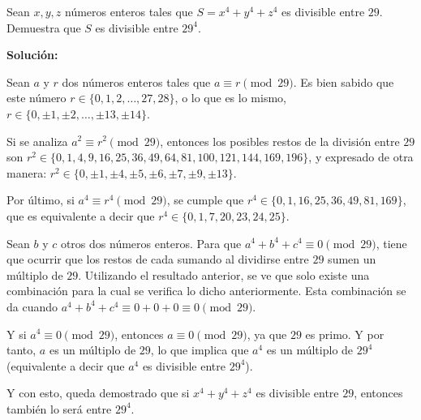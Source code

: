 \documentclass[../../main.tex]{subfiles}
\begin{document}
  \begin{shaded}
    Sean $x, y, z$ números enteros tales que $S = x^4 + y^4 + z^4$ es divisible entre $29$. Demuestra que $S$ es divisible entre $29^4$.
  \end{shaded}

  \textbf{Solución:}

  Sean $a$ y $r$ dos números enteros tales que $a \equiv r \pmod{29}$. Es bien sabido que este número $r \in \{0, 1, 2, \dots, 27, 28\}$, o lo que es lo mismo, $r \in \{0, \pm 1, \pm 2, \dots, \pm 13, \pm 14\}$.

  Si se analiza $a^2 \equiv r^2 \pmod{29}$, entonces los posibles restos de la división entre $29$ son $r^2 \in \{0, 1, 4, 9, 16, 25, 36, 49, 64, 81, 100, 121, 144, 169, 196\}$, y expresado de otra manera: $r^2 \in \{0, \pm 1, \pm 4, \pm 5, \pm 6, \pm 7, \pm 9, \pm 13\}$.

  Por último, si $a^4 \equiv r^4 \pmod{29}$, se cumple que $r^4 \in \{0, 1, 16, 25, 36, 49, 81, 169\}$, que es equivalente a decir que $r^4 \in \{0, 1, 7, 20, 23, 24, 25\}$.

  Sean $b$ y $c$ otros dos números enteros. Para que $a^4 + b^4 + c^4 \equiv 0 \pmod{29}$, tiene que ocurrir que los restos de cada sumando al dividirse entre $29$ sumen un múltiplo de $29$. Utilizando el resultado anterior, se ve que solo existe una combinación para la cual se verifica lo dicho anteriormente. Esta combinación se da cuando $a^4 + b^4 + c^4 \equiv 0 + 0 + 0 \equiv 0 \pmod{29}$.

  Y si $a^4 \equiv 0 \pmod{29}$, entonces $a \equiv 0 \pmod{29}$, ya que $29$ es primo. Y por tanto, $a$ es un múltiplo de $29$, lo que implica que $a^4$ es un múltiplo de $29^4$ (equivalente a decir que $a^4$ es divisible entre $29^4$).

  Y con esto, queda demostrado que si $x^4 + y^4 + z^4$ es divisible entre $29$, entonces también lo será entre $29^4$.
\end{document}
